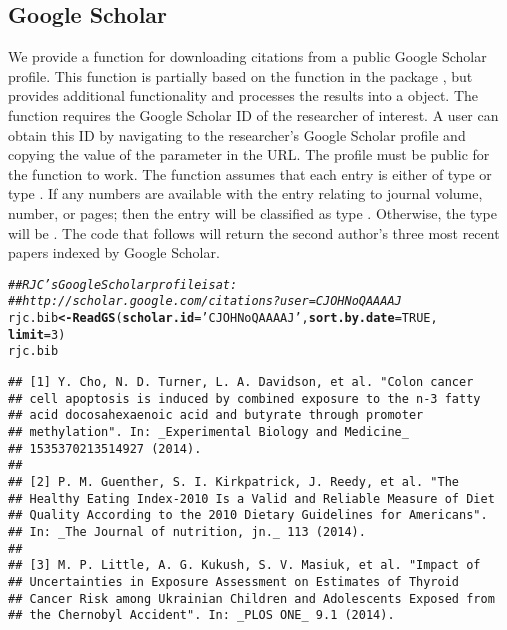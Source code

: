 \documentclass[article]{jss}\usepackage[]{graphicx}\usepackage[]{color}
\makeatletter
\newcommand{\hlnum}[1]{\textcolor[rgb]{0.125,0.125,1}{#1}}%
\newcommand{\hlstr}[1]{\textcolor[rgb]{0.125,0.125,1}{#1}}%
\newcommand{\hlcom}[1]{\textcolor[rgb]{1,0,0.753}{\textit{#1}}}%
\newcommand{\hlstd}[1]{\textcolor[rgb]{0.251,0.251,0.282}{#1}}%
\newcommand{\hlkwb}[1]{\textcolor[rgb]{0.439,0.251,1}{\textbf{#1}}}%
\newcommand{\hlkwc}[1]{\textcolor[rgb]{0.529,0,0.184}{\textbf{#1}}}%
\newcommand{\hlkwd}[1]{\textcolor[rgb]{0.251,0.251,0.282}{\textbf{#1}}}%
\newenvironment{kframe}{%
 \def\at@end@of@kframe{}%
 \ifinner\ifhmode%
  \def\at@end@of@kframe{\end{minipage}}%
  \begin{minipage}{\columnwidth}%
 \fi\fi%
 \def\FrameCommand##1{\hskip\@totalleftmargin \hskip-\fboxsep
 \colorbox{shadecolor}{##1}\hskip-\fboxsep
     \hskip-\linewidth \hskip-\@totalleftmargin \hskip\columnwidth}%
 \MakeFramed {\advance\hsize-\width
   \@totalleftmargin\z@ \linewidth\hsize
   \@setminipage}}%
 {\par\unskip\endMakeFramed%
 \at@end@of@kframe}
\newenvironment{knitrout}{}{} %
\makeatother
\begin{document}
\subsection{Google Scholar}
We provide a function for downloading citations from a public Google Scholar profile.  This function is partially based on the function  in the  package \citep{scholar}, but provides additional functionality and processes the results into a  object.  The function requires the Google Scholar ID of the researcher of interest.  A user can obtain this ID by navigating to the researcher's Google Scholar profile and copying the value of the  parameter in the URL.  The profile must be public for the function to work.  The function assumes that each entry is either of type  or type .  If any numbers are available with the entry relating to journal volume, number, or pages; then the entry will be classified as type .  Otherwise, the type will be .  The code that follows will return the second author's three most recent papers indexed by Google Scholar.
\begin{knitrout}
\color{fgcolor}\begin{kframe}
\begin{alltt}
\hlcom{## RJC's Google Scholar profile is at: }
\hlcom{## http://scholar.google.com/citations?user=CJOHNoQAAAAJ}
\hlstd{rjc.bib} \hlkwb{<-} \hlkwd{ReadGS}\hlstd{(}\hlkwc{scholar.id} \hlstd{=} \hlstr{'CJOHNoQAAAAJ'}\hlstd{,} \hlkwc{sort.by.date} \hlstd{=} \hlnum{TRUE}\hlstd{,}
                  \hlkwc{limit} \hlstd{=} \hlnum{3}\hlstd{)}
\hlstd{rjc.bib}
\end{alltt}
\begin{verbatim}
## [1] Y. Cho, N. D. Turner, L. A. Davidson, et al. "Colon cancer
## cell apoptosis is induced by combined exposure to the n-3 fatty
## acid docosahexaenoic acid and butyrate through promoter
## methylation". In: _Experimental Biology and Medicine_
## 1535370213514927 (2014).
## 
## [2] P. M. Guenther, S. I. Kirkpatrick, J. Reedy, et al. "The
## Healthy Eating Index-2010 Is a Valid and Reliable Measure of Diet
## Quality According to the 2010 Dietary Guidelines for Americans".
## In: _The Journal of nutrition, jn._ 113 (2014).
## 
## [3] M. P. Little, A. G. Kukush, S. V. Masiuk, et al. "Impact of
## Uncertainties in Exposure Assessment on Estimates of Thyroid
## Cancer Risk among Ukrainian Children and Adolescents Exposed from
## the Chernobyl Accident". In: _PLOS ONE_ 9.1 (2014).
\end{verbatim}
\end{kframe}
\end{knitrout}
\end{document}
